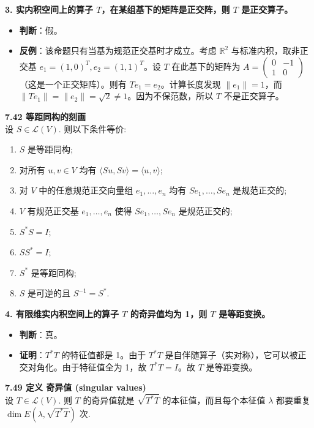 \documentclass[12pt,a4paper]{article}
\begin{document}
\textbf{3. 实内积空间上的算子 $T$，在某组基下的矩阵是正交阵，则 $T$ 是正交算子。}
\begin{itemize}
    \item \textbf{判断}：假。
    \item \textbf{反例}：该命题只有当基为规范正交基时才成立。考虑 $\mathbb{R}^2$ 与标准内积，取非正交基 $e_1 = (1,0)^T, e_2 = (1,1)^T$。设 $T$ 在此基下的矩阵为 $A = \begin{pmatrix} 0 & -1 \\ 1 & 0 \end{pmatrix}$ （这是一个正交矩阵）。则有 $Te_1 = e_2$。计算长度发现 $\|e_1\| = 1$，而 $\|Te_1\| = \|e_2\| = \sqrt{2} \neq 1$。因为不保范数，所以 $T$ 不是正交算子。
\end{itemize}

\begin{tcolorbox}[colback=gray!10, colframe=gray!30, sharp corners]
    \textbf{7.42 等距同构的刻画}\\
    设 $S \in \mathcal{L}(V)$. 则以下条件等价:
    \begin{enumerate}
        \item[(a)] $S$ 是等距同构;
        \item[(b)] 对所有 $u,v \in V$ 均有 $\langle Su, Sv \rangle = \langle u, v \rangle$;
        \item[(c)] 对 $V$ 中的任意规范正交向量组 $e_1,\dots,e_n$ 均有 $Se_1,\dots,Se_n$ 是规范正交的;
        \item[(d)] $V$ 有规范正交基 $e_1,\dots,e_n$ 使得 $Se_1,\dots,Se_n$ 是规范正交的;
        \item[(e)] $S^*S = I$;
        \item[(f)] $SS^* = I$;
        \item[(g)] $S^*$ 是等距同构;
        \item[(h)] $S$ 是可逆的且 $S^{-1} = S^*$.
    \end{enumerate}
\end{tcolorbox}

\textbf{4. 有限维实内积空间上的算子 $T$ 的奇异值均为 1，则 $T$ 是等距变换。}
\begin{itemize}
    \item \textbf{判断}：真。
    \item \textbf{证明}：$T^*T$ 的特征值都是 1。由于 $T^*T$ 是自伴随算子（实对称），它可以被正交对角化。由于特征值全为 1，故 $T^*T = I$。故 $T$ 是等距变换。
\end{itemize}

\begin{tcolorbox}[colback=gray!10, colframe=gray!30, sharp corners]
    \textbf{7.49 定义 奇异值 (singular values)}\\
    设 $T \in \mathcal{L}(V)$. 则 $T$ 的奇异值就是 $\sqrt{T^*T}$ 的本征值，而且每个本征值 $\lambda$ 都要重复 $\dim E(\lambda, \sqrt{T^*T})$ 次.
\end{tcolorbox}
\end{document}
